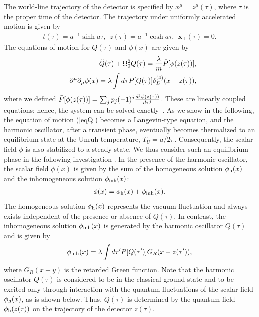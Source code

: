 \documentclass[aps,prd,preprintnumbers,nofootinbib,showpacs]{revtex4}%
\begin{document}
\begin{widetext}
The world-line trajectory of the detector is specified by
$x^\mu=z^\mu(\tau)$, where $\tau$ is the proper time of the detector. 
The trajectory under uniformly accelerated motion is given by 
\begin{eqnarray}
t(\tau)=a^{-1}\sinh a\tau, ~~z(\tau)=a^{-1}\cosh a\tau, ~~\bm x_\perp(\tau)=0.
\label{trajec}
\end{eqnarray} 
The equations of motion for $Q(\tau)$ and $\phi(x)$ are given by 
\begin{eqnarray}
&&\ddot Q(\tau)+\Omega_0^2Q(\tau)={\lambda\over m}\bar P[\phi(z(\tau))]
\label{eqQ}, \\
&&\partial^\mu \partial_\mu\phi(x)=\lambda\int d\tau P[Q(\tau)]\delta^{(4)}_D(x-z(\tau)),
\label{eqphiA}
\end{eqnarray}
where we defined $\bar P[\phi(z(\tau))]=\sum_jp_j(-1)^j{d^j \phi(z(\tau))\over d\tau^j}$.
These are linearly coupled equations; hence, the system
can be solved exactly~\cite{LH,LH2}. 
As we show in the following, the equation of motion (\ref{eqQ}) becomes a Langevin-type equation, 
and the harmonic oscillator, after a transient phase, 
 eventually becomes thermalized to an equilibrium state at the Unruh temperature,
$T_U=a/2\pi$. Consequently, the scalar field $\phi$ is also stabilized to a steady state.
We thus consider such an equilibrium phase in the following investigation \cite{IYZ,IYZ2013}.
In the presence of the harmonic oscillator, 
the scalar field $\phi(x)$ is given by the sum of the homogeneous solution $\phi_{\rm h}(x)$ and the 
inhomogeneous solution $\phi_{\rm inh}(x)$: 
\begin{eqnarray}
  \phi(x)=\phi_{\rm h}(x)+\phi_{\rm inh}(x) .
\label{phpinh}
\end{eqnarray}
The homogeneous solution $\phi_{\rm h}(x)$ represents the vacuum fluctuation and always exists independent of
the presence or absence of $Q(\tau)$.
In contrast, the inhomogeneous solution 
 $\phi_{\rm inh}(x)$ is generated by the harmonic oscillator $Q(\tau)$ and is given by
\begin{eqnarray}
\phi_{\rm inh}(x) =\lambda \int d\tau' P[Q(\tau')]G_R(x-z(\tau')), 
\label{phiQG}
\end{eqnarray}
where $G_R(x-y)$ is the retarded Green function. 
Note that the harmonic oscillator $Q(\tau)$ is considered to be in the classical ground state 
and to be excited only through interaction with the quantum fluctuations of the scalar field 
$\phi_{\rm h}(x)$, as is shown below. 
Thus, $Q(\tau)$ is determined by the quantum field $\phi_{\rm h}(z(\tau))$ 
on the trajectory of the detector 
$z(\tau)$. 


\end{widetext}
\end{document}
